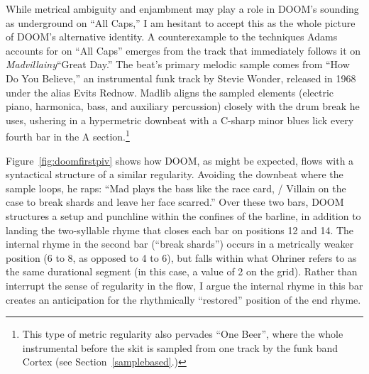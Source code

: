 While metrical ambiguity and enjambment may play a role in DOOM's sounding as underground on ``All Caps,''
I am hesitant to accept this as the whole picture of DOOM's alternative identity. A counterexample to the
techniques Adams accounts for on ``All Caps'' emerges from the track that immediately follows it on 
\textit{Madvillainy}\textemdash ``Great Day.'' The beat's primary melodic sample comes from ``How Do You
Believe,'' an instrumental funk track by Stevie Wonder, released in 1968 under the alias Evits Rednow.
Madlib aligns the sampled elements (electric piano, harmonica, bass, and auxiliary percussion) closely
with the drum break he uses, ushering in a hypermetric downbeat with a C-sharp minor blues lick every
fourth bar in the A section.\footnote{
    This type of metric regularity also pervades ``One Beer'', where the whole instrumental before
    the skit is sampled from one track by the funk band Cortex (see Section~\ref{samplebased}.)}

Figure~\ref{fig:doomfirstpiv} shows how DOOM, as might be expected, flows with a syntactical structure
of a  similar regularity. Avoiding the downbeat where the sample loops, he raps: ``Mad plays the bass 
like the race card, / Villain on the case to break shards and leave her face scarred.'' Over these two 
bars, DOOM structures a setup and punchline within the confines of the barline, in addition to landing 
the two-syllable rhyme that closes each bar on positions 12 and 14. The internal rhyme in the second bar
(``break shards'') occurs in a metrically weaker position (6 to 8, as opposed to 4 to 6), but falls
within what Ohriner refers to as the same durational segment (in this case, a value of 2 on the grid). 
Rather than interrupt the sense of regularity in the flow, I argue the internal rhyme in this bar 
creates an anticipation for the rhythmically ``restored'' position of the end rhyme.
\clearpage

